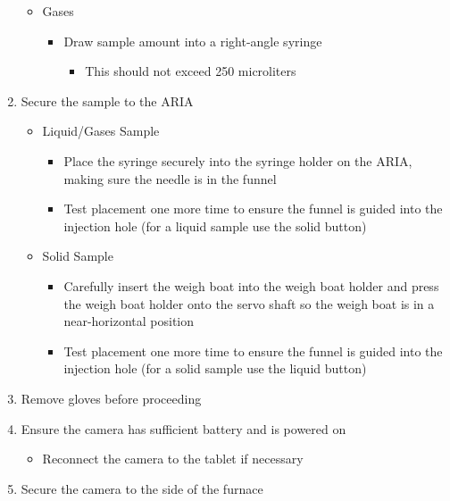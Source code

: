 \documentclass[letterpaper,11pt]{article}
\begin{document}
\begin{enumerate}
\begin{itemize}
        \item Gases
            \begin{itemize}
            \item Draw sample amount into a right-angle syringe  
                \begin{itemize}
                \item This should not exceed 250 microliters
                \end{itemize}
            \end{itemize}
            
        \end{itemize}

     \item Secure the sample to the ARIA
        \begin{itemize}
        \item Liquid/Gases Sample
            \begin{itemize}
            \item Place the syringe securely into the syringe holder on the 
                ARIA, making sure the needle is in the funnel
			\item Test placement one more time to ensure the funnel is guided 
                into the injection hole (for a liquid sample use the 
                solid button)
            \end{itemize}
            
        \item Solid Sample
            \begin{itemize}
            \item Carefully insert the weigh boat into the weigh boat holder and
                press the weigh boat holder onto the servo shaft so the weigh 
                boat is in a near-horizontal position
			\item Test placement one more time to ensure the funnel is guided 
                into the injection hole (for a solid sample use the 
                liquid button)
            \end{itemize}
            
        \end{itemize}
            
    \item Remove gloves before proceeding
	\item Ensure the camera has sufficient battery and is powered on
        \begin{itemize}
        \item Reconnect the camera to the tablet if necessary
        \end{itemize}
    \item Secure the camera to the side of the furnace



\end{enumerate}
\end{document}
